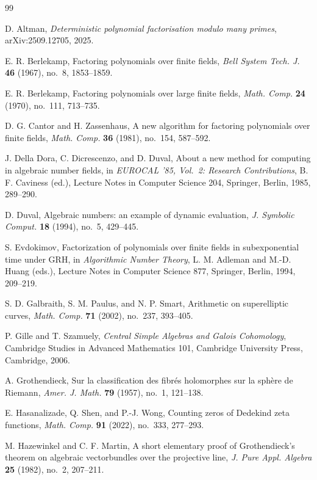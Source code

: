 \begin{thebibliography}{99}
\raggedright

D. Altman, \emph{Deterministic polynomial factorisation modulo many primes},
arXiv:2509.12705, 2025.

E. R. Berlekamp, Factoring polynomials over finite fields,
\emph{Bell System Tech. J.} \textbf{46} (1967), no.~8, 1853--1859.

E. R. Berlekamp, Factoring polynomials over large finite fields,
\emph{Math. Comp.} \textbf{24} (1970), no.~111, 713--735.

D. G. Cantor and H. Zassenhaus, A new algorithm for factoring polynomials
over finite fields, \emph{Math. Comp.} \textbf{36} (1981), no.~154, 587--592.

J. Della Dora, C. Dicrescenzo, and D. Duval,
About a new method for computing in algebraic number fields,
in \emph{EUROCAL '85, Vol.~2: Research Contributions},
B. F. Caviness (ed.), Lecture Notes in Computer Science 204,
Springer, Berlin, 1985, 289--290.

D. Duval, Algebraic numbers: an example of dynamic evaluation,
\emph{J. Symbolic Comput.} \textbf{18} (1994), no.~5, 429--445.

S. Evdokimov, Factorization of polynomials over finite fields in
subexponential time under GRH,
in \emph{Algorithmic Number Theory}, L. M. Adleman and M.-D. Huang (eds.),
Lecture Notes in Computer Science 877, Springer, Berlin, 1994, 209--219.

S. D. Galbraith, S. M. Paulus, and N. P. Smart,
Arithmetic on superelliptic curves,
\emph{Math. Comp.} \textbf{71} (2002), no.~237, 393--405.

P. Gille and T. Szamuely,
\emph{Central Simple Algebras and Galois Cohomology},
Cambridge Studies in Advanced Mathematics 101,
Cambridge University Press, Cambridge, 2006.

A. Grothendieck, Sur la classification des fibr\'es holomorphes sur la
sph\`ere de Riemann,
\emph{Amer. J. Math.} \textbf{79} (1957), no.~1, 121--138.

E. Hasanalizade, Q. Shen, and P.-J. Wong,
Counting zeros of Dedekind zeta functions,
\emph{Math. Comp.} \textbf{91} (2022), no.~333, 277--293.

M. Hazewinkel and C. F. Martin,
A short elementary proof of Grothendieck's theorem on algebraic
vectorbundles over the projective line,
\emph{J. Pure Appl. Algebra} \textbf{25} (1982), no.~2, 207--211.


\end{thebibliography}
